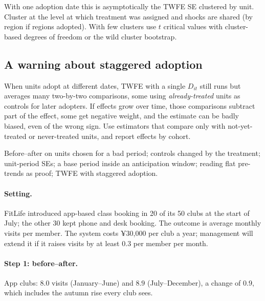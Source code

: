 \documentclass[11pt]{article}
\begin{document}
With one adoption date this is asymptotically the TWFE SE clustered by unit. Cluster at the level at which treatment was assigned and shocks are
shared (by region if regions adopted). With few clusters use $t$ critical values with cluster-based degrees of freedom or the wild cluster
bootstrap.

\subsection{A warning about staggered adoption}

When units adopt at different dates, TWFE with a single $D_{it}$ still runs but averages many two-by-two comparisons, some using
\emph{already-treated} units as controls for later adopters. If effects grow over time, those comparisons subtract part of the effect, some get
negative weight, and the estimate can be badly biased, even of the wrong sign. Use estimators that compare only with not-yet-treated or
never-treated units, and report effects by cohort.

\begin{pitfall}
Before--after on units chosen for a bad period; controls changed by the treatment; unit-period SEs; a base period inside an anticipation window;
reading flat pre-trends as proof; TWFE with staggered adoption.
\end{pitfall}

\sectiontwo

\paragraph{Setting.} FitLife introduced app-based class booking in 20 of its 50 clubs at the start of July; the other 30 kept phone and desk
booking. The outcome is average monthly visits per member. The system costs ¥30{,}000 per club a year; management will extend it if it raises
visits by at least $0.3$ per member per month.

\paragraph{Step 1: before--after.} App clubs: $8.0$ visits (January--June) and $8.9$ (July--December), a change of $0.9$, which includes the autumn
rise every club sees.
\end{document}
